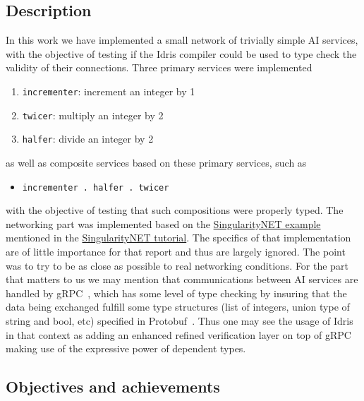 \documentclass[]{report}
\begin{document}
\subsection{Description}

In this work we have implemented a small network of trivially simple
AI services, with the objective of testing if the Idris compiler could
be used to type check the validity of their connections. Three primary
services were implemented
\begin{enumerate}
\item \texttt{incrementer}: increment an integer by 1
\item \texttt{twicer}: multiply an integer by 2
\item \texttt{halfer}: divide an integer by 2
\end{enumerate}
as well as composite services based on these primary services, such as
\begin{itemize}
\item \texttt{incrementer . halfer . twicer}
\end{itemize}
with the objective of testing that such compositions were properly
typed.  The networking part was implemented based on the
\href{https://github.com/singnet/example-service}{SingularityNET
  example} mentioned in the
\href{https://dev.singularitynet.io/tutorials/publish/}{SingularityNET
  tutorial}.  The specifics of that implementation are of little
importance for that report and thus are largely ignored.  The point
was to try to be as close as possible to real networking conditions.
For the part that matters to us we may mention that communications
between AI services are handled by gRPC~\cite{TODO}, which has some
level of type checking by insuring that the data being exchanged
fulfill some type structures (list of integers, union type of string
and bool, etc) specified in Protobuf~\cite{TODO}.  Thus one may see
the usage of Idris in that context as adding an enhanced refined
verification layer on top of gRPC making use of the expressive power
of dependent types.

\subsection{Objectives and achievements}
\end{document}
